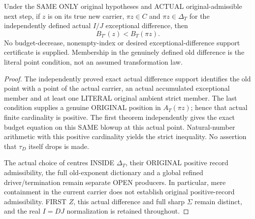 \begin{theorem}
\label{hir:sharp-original-curve-actual-tauD-point-contact-budget-strict-drop}
\leanok
Under the SAME ONLY original hypotheses and ACTUAL original-admissible next
step, if $z$ is on its true new carrier, $\pi z\in C$ and
$\pi z\in\Delta_T$ for the independently defined actual $I/J$ exceptional
difference, then
\[
 B_{T'}(z)<B_T(\pi z).
\]
No budget-decrease, nonempty-index or desired exceptional-difference
support certificate is supplied. Membership in the genuinely defined old
difference is the literal point condition, not an assumed transformation law.
\end{theorem}
\begin{proof}
The independently proved exact actual difference support identifies the
old point with a point of the actual carrier, an actual accumulated
exceptional member and at least one LITERAL original ambient strict
member. The last condition supplies a genuine ORIGINAL position in
$A_T(\pi z)$; hence that actual finite cardinality is positive. The first
theorem independently gives the exact budget equation on this SAME blowup
at this actual point. Natural-number arithmetic with this positive
cardinality yields the strict inequality. No assertion that $\tau_D$
itself drops is made.

The actual choice of centres INSIDE $\Delta_T$, their ORIGINAL positive
record admissibility, the full old-exponent dictionary and a global
refined driver/termination remain separate OPEN producers. In particular,
mere containment in the current carrier does not establish original
positive-record admissibility. FIRST $Z$, this actual difference and full
sharp $\Sigma$ remain distinct, and the real $I=D J$ normalization is
retained throughout.
\end{proof}
